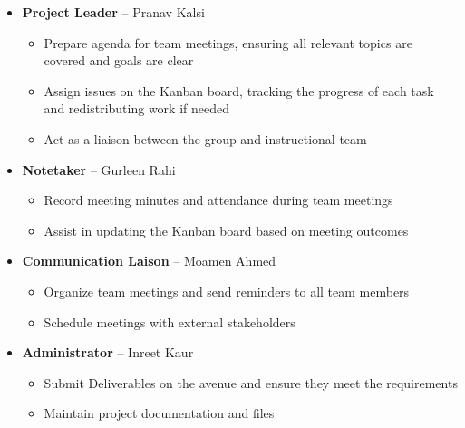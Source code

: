 \documentclass{article}
\begin{document}
\begin{itemize}
\item \textbf{Project Leader} -- Pranav Kalsi
\begin{itemize}
\item Prepare agenda for team meetings, ensuring all relevant topics are covered and goals are clear
\item Assign issues on the Kanban board, tracking the progress of each task and redistributing work if needed
\item Act as a liaison between the group and instructional team
\end{itemize}

\item \textbf{Notetaker} -- Gurleen Rahi
\begin{itemize}
\item Record meeting minutes and attendance during team meetings
\item Assist in updating the Kanban board based on meeting outcomes
\end{itemize}

\item \textbf{Communication Laison} -- Moamen Ahmed
\begin{itemize}
\item Organize team meetings and send reminders to all team members
\item Schedule meetings with external stakeholders
\end{itemize}

\item \textbf{Administrator} -- Inreet Kaur
\begin{itemize}
\item Submit Deliverables on the avenue and ensure they meet the requirements
\item Maintain project documentation and files
\end{itemize}
\end{itemize} 
\end{document}
